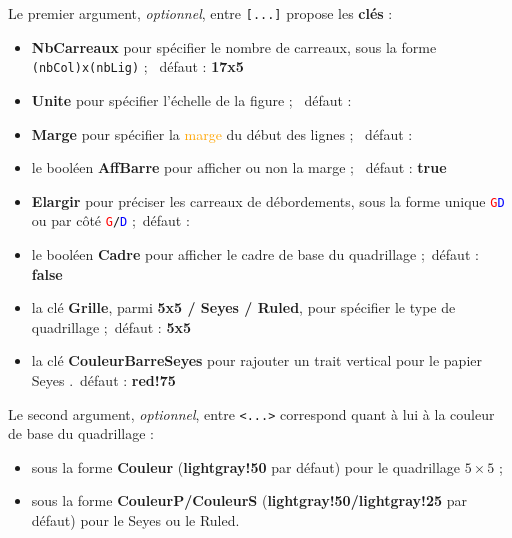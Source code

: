 \documentclass[a4paper]{article}
\newcommand\Cle[1]{{\bfseries\sffamily\textlangle #1\textrangle}}
\begin{document}
Le premier argument, \textit{optionnel}, entre \texttt{[...]} propose les \Cle{clés} :

\begin{itemize}
	\item \Cle{NbCarreaux} pour spécifier le nombre de carreaux, sous la forme \texttt{(nbCol)x(nbLig)} ; \hfill~défaut : \Cle{17x5}
	\item \Cle{Unite} pour spécifier l'échelle de la figure ; \hfill~défaut : \Cle{1}
	\item \Cle{Marge} pour spécifier la \textcolor{orange}{marge} du début des lignes ; \hfill~défaut : \Cle{0}
	\item le booléen \Cle{AffBarre} pour afficher ou non la marge ; \hfill~défaut : \Cle{true}
	\item \Cle{Elargir} pour préciser les carreaux de débordements, sous la forme unique \texttt{\textcolor{red}{G}\textcolor{blue}{D}} ou par côté \texttt{\textcolor{red}{G}/\textcolor{blue}{D}} ;\hfill~défaut : \Cle{0}
	\item le booléen \Cle{Cadre} pour afficher le cadre de base du quadrillage ;\hfill~défaut : \Cle{false}
	\item la clé \Cle{Grille}, parmi \Cle{5x5 / Seyes / Ruled}, pour spécifier le type de quadrillage ;\hfill~défaut : \Cle{5x5}
	\item la clé \Cle{CouleurBarreSeyes} pour rajouter un trait vertical pour le papier Seyes .\hfill~défaut : \Cle{red!75}
\end{itemize}

Le second argument, \textit{optionnel}, entre \texttt{<...>} correspond quant à lui à la couleur de base du quadrillage :

\begin{itemize}
	\item sous la forme \Cle{Couleur} (\Cle{lightgray!50} par défaut) pour le quadrillage $5\times5$ ;
	\item sous la forme \Cle{CouleurP/CouleurS} (\Cle{lightgray!50/lightgray!25} par défaut) pour le Seyes ou le Ruled.
\end{itemize}

\medskip
\end{document}
